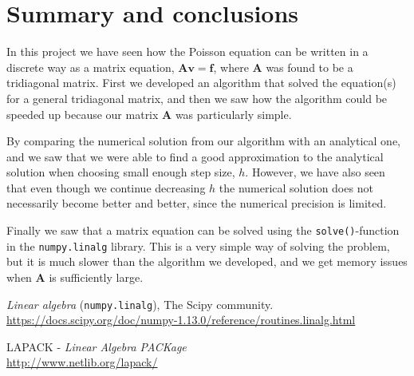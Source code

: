 \documentclass[12pt, a4paper]{article}
\begin{document}
\section{Summary and conclusions}

In this project we have seen how the Poisson equation can be written in a discrete way as a matrix 
equation, $\mathbf{A} \mathbf{v} = \mathbf{f}$, where $\mathbf{A}$ was found to be a tridiagonal matrix. 
First we developed an algorithm that solved the equation(s) for a general tridiagonal matrix, and then we 
saw how the algorithm could be speeded up because our matrix $\mathbf{A}$ was particularly simple. 

By comparing the numerical solution from our algorithm with an analytical one, and we saw that we were 
able to find a good approximation to the analytical solution when choosing small enough step size, $h$. 
However, we have also seen that even though we continue decreasing $h$ the numerical solution does not 
necessarily become better and better, since the numerical precision is limited. 

Finally we saw that a matrix equation can be solved using the \texttt{solve()}-function in the 
\texttt{numpy.linalg} library. This is a very simple way of solving the problem, but it is much slower 
than the algorithm we developed, and we get memory issues when $\mathbf{A}$ is sufficiently large. 


\begin{thebibliography}{40}

 \textit{Linear algebra} (\texttt{numpy.linalg}), The Scipy community. \\ 
\href{https://docs.scipy.org/doc/numpy-1.13.0/reference/routines.linalg.html}
{https://docs.scipy.org/doc/numpy-1.13.0/reference/routines.linalg.html} 

 LAPACK - \textit{Linear Algebra PACKage} \\ 
\href{http://www.netlib.org/lapack/}{http://www.netlib.org/lapack/}

\end{thebibliography}
\end{document}
